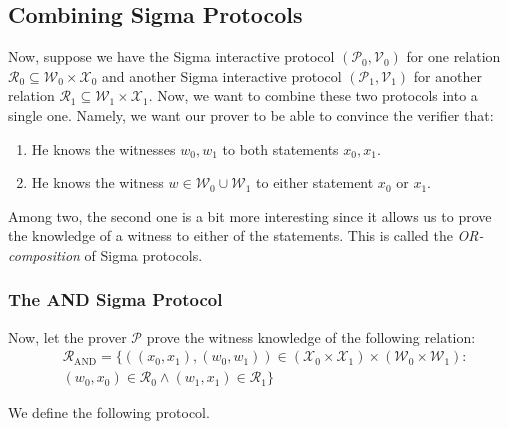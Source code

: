 \documentclass[../lecture-notes.tex]{subfiles}
\begin{document}
\subsection{Combining Sigma Protocols}

Now, suppose we have the Sigma interactive protocol $(\mathcal{P}_0,\mathcal{V}_0)$ for one relation $\mathcal{R}_0 \subseteq \mathcal{W}_0 \times \mathcal{X}_0$ and another Sigma interactive protocol $(\mathcal{P}_1,\mathcal{V}_1)$ for another relation $\mathcal{R}_1 \subseteq \mathcal{W}_1 \times \mathcal{X}_1$. Now, we want to combine these two protocols into a single one. Namely, we want our prover to be able to convince the verifier that:
\begin{enumerate}
    \item He knows the witnesses $w_0,w_1$ to both statements $x_0,x_1$.
    \item He knows the witness $w \in \mathcal{W}_0 \cup \mathcal{W}_1$ to either statement $x_0$ or $x_1$.
\end{enumerate}

Among two, the second one is a bit more interesting since it allows us to prove the knowledge of a witness to either of the statements. This is called the \textit{OR-composition} of Sigma protocols.

\subsubsection{The AND Sigma Protocol}

Now, let the prover $\mathcal{P}$ prove the witness knowledge of the following relation:
\begin{equation*}
    \begin{aligned}
        &\mathcal{R}_{\text{AND}} = \{ ((x_0,x_1), (w_0,w_1)) \in (\mathcal{X}_0 \times \mathcal{X}_1) \times (\mathcal{W}_0 \times \mathcal{W}_1): \\
        &(w_0,x_0) \in \mathcal{R}_0 \wedge (w_1,x_1) \in \mathcal{R}_1 \}        
    \end{aligned}
\end{equation*}

We define the following protocol.
\end{document}
